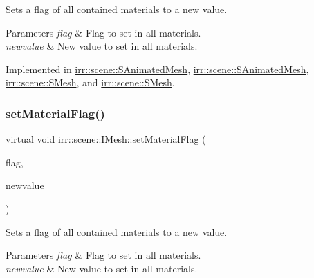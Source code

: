 Sets a flag of all contained materials to a new value. 


\begin{DoxyParams}{Parameters}
{\em flag} & Flag to set in all materials. \\
\hline
{\em newvalue} & New value to set in all materials. \\
\hline
\end{DoxyParams}


Implemented in \hyperlink{structirr_1_1scene_1_1SAnimatedMesh_aefe38066b9c38c6d4ea522b5d988769e}{irr\+::scene\+::\+S\+Animated\+Mesh}, \hyperlink{structirr_1_1scene_1_1SAnimatedMesh_aefe38066b9c38c6d4ea522b5d988769e}{irr\+::scene\+::\+S\+Animated\+Mesh}, \hyperlink{structirr_1_1scene_1_1SMesh_a0ca30440aef6ca66dfc177b2a0e41e52}{irr\+::scene\+::\+S\+Mesh}, and \hyperlink{structirr_1_1scene_1_1SMesh_a0ca30440aef6ca66dfc177b2a0e41e52}{irr\+::scene\+::\+S\+Mesh}.

\mbox{\label{classirr_1_1scene_1_1IMesh_a56e034b671f52653d6c91e0ffa42febd}} 
\subsubsection{\texorpdfstring{set\+Material\+Flag()}{setMaterialFlag()}\hspace{0.1cm}{\footnotesize\ttfamily [2/2]}}
{\footnotesize\ttfamily virtual void irr\+::scene\+::\+I\+Mesh\+::set\+Material\+Flag (\begin{DoxyParamCaption}\item[{\hyperlink{namespaceirr_1_1video_a8a3bc00ae8137535b9fbc5f40add70d3}{video\+::\+E\+\_\+\+M\+A\+T\+E\+R\+I\+A\+L\+\_\+\+F\+L\+AG}}]{flag,  }\item[{bool}]{newvalue }\end{DoxyParamCaption})\hspace{0.3cm}{\ttfamily [pure virtual]}}



Sets a flag of all contained materials to a new value. 


\begin{DoxyParams}{Parameters}
{\em flag} & Flag to set in all materials. \\
\hline
{\em newvalue} & New value to set in all materials. \\
\hline
\end{DoxyParams}


